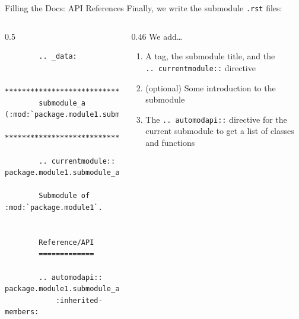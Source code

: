 \begin{darkframe}[fragile]{Filling the Docs: API References}
  Finally, we write the submodule \texttt{.rst} files:

  \begin{columns}[onlytextwidth]
    \begin{column}{0.5\textwidth}
      \footnotesize
      \begin{verbatim}
        .. _data:

        ************************************************
        submodule_a (:mod:`package.module1.submodule_a`)
        ************************************************

        .. currentmodule:: package.module1.submodule_a

        Submodule of :mod:`package.module1`.


        Reference/API
        =============

        .. automodapi:: package.module1.submodule_a
            :inherited-members:
      \end{verbatim}
    \end{column}
    \hfill
    \begin{column}{0.46\textwidth}
      We add\dots
      \begin{enumerate}
        \setlength{\itemsep}{1.5em}
        \item A tag, the submodule title, and the\\\texttt{.. currentmodule::} directive
        \item (optional) Some introduction to the submodule
        \item The \texttt{.. automodapi::} directive for the current submodule to get a list of
          classes and functions
      \end{enumerate}
    \end{column}
  \end{columns}
\end{darkframe}

